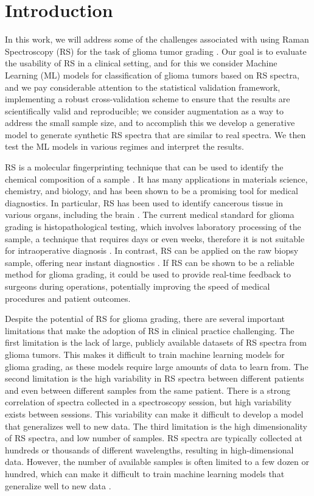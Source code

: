 \chapter{Introduction}

In this work, we will address some of the challenges associated with using Raman Spectroscopy (RS) for the task of glioma tumor grading \cite{Trevisi2025,stupak2025raman}. Our goal is to evaluate the usability of RS in a clinical setting, and for this we consider Machine Learning (ML) models for classification of glioma tumors based on RS spectra, and we pay considerable attention to the statistical validation framework, implementing a robust cross-validation scheme to ensure that the results are scientifically valid and reproducible; we consider augmentation as a way to address the small sample size, and to accomplish this we develop a generative model to generate synthetic RS spectra that are similar to real spectra. We then test the ML models in various regimes and interpret the results.

RS is a molecular fingerprinting technique that can be used to identify the chemical composition of a sample \cite{Jones2019}. It has many applications in materials science, chemistry, and biology, and has been shown to be a promising tool for medical diagnostics. In particular, RS has been used to identify cancerous tissue in various organs, including the brain \cite{Auner2018}.
The current medical standard for glioma grading is histopathological testing, which involves laboratory processing of the sample, a technique that requires days or even weeks, therefore it is not suitable for intraoperative diagnosis \cite{whitfield2022classificationgliomas}.
In contrast, RS can be applied on the raw biopsy sample, offering near instant diagnostics \cite{stupak2025raman, Trevisi2025}. If RS can be shown to be a reliable method for glioma grading, it could be used to provide real-time feedback to surgeons during operations, potentially improving the speed of medical procedures and patient outcomes.

Despite the potential of RS for glioma grading, there are several important limitations that make the adoption of RS in clinical practice challenging. The first limitation is the lack of large, publicly available datasets of RS spectra from glioma tumors. This makes it difficult to train machine learning models for glioma grading, as these models require large amounts of data to learn from. The second limitation is the high variability in RS spectra between different patients and even between different samples from the same patient. There is a strong correlation of spectra collected in a spectroscopy session, but high variability exists between sessions. This variability can make it difficult to develop a model that generalizes well to new data. The third limitation is the high dimensionality of RS spectra, and low number of samples. RS spectra are typically collected at hundreds or thousands of different wavelengths, resulting in high-dimensional data. However, the number of available samples is often limited to a few dozen or hundred, which can make it difficult to train machine learning models that generalize well to new data \cite{wang2024current, shen2026advances}.

